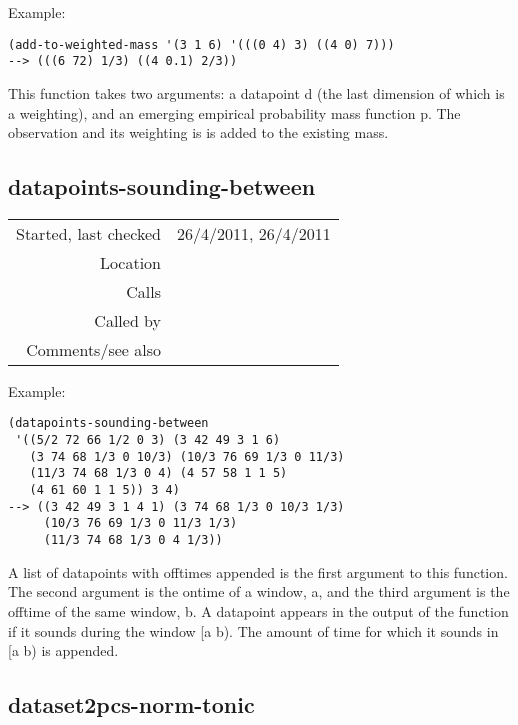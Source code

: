 \vspace{0.5cm}
\noindent Example:
\begin{verbatim}
(add-to-weighted-mass '(3 1 6) '(((0 4) 3) ((4 0) 7)))
--> (((6 72) 1/3) ((4 0.1) 2/3))
\end{verbatim}

\noindent This function takes two arguments: a
datapoint d (the last dimension of which is a
weighting), and an emerging empirical probability mass
function p. The observation and its weighting is
is added to the existing mass.


\subsection*{datapoints-sounding-between}\label{fun:datapoints-sounding-between}

\vspace{0.3cm}
\begin{tabular}{r|p{8cm}}
Started, last checked & 26/4/2011, 26/4/2011 \\
Location & \nameref{sec:keyscape} \\
Calls & \nameref{fun:my-last} \\
Called by & \nameref{fun:keyscape-list} \\
Comments/see also & \nameref{fun:points-sounding-at}
\end{tabular}

\vspace{0.5cm}
\noindent Example:
\begin{verbatim}
(datapoints-sounding-between
 '((5/2 72 66 1/2 0 3) (3 42 49 3 1 6)
   (3 74 68 1/3 0 10/3) (10/3 76 69 1/3 0 11/3)
   (11/3 74 68 1/3 0 4) (4 57 58 1 1 5)
   (4 61 60 1 1 5)) 3 4)
--> ((3 42 49 3 1 4 1) (3 74 68 1/3 0 10/3 1/3)
     (10/3 76 69 1/3 0 11/3 1/3)
     (11/3 74 68 1/3 0 4 1/3))
\end{verbatim}

\noindent A list of datapoints with offtimes
appended is the first argument to this function. The
second argument is the ontime of a window, a, and the
third argument is the offtime of the same window, b. A
datapoint appears in the output of the function if it
sounds during the window [a b). The amount of time for
which it sounds in [a b) is appended.


\subsection*{dataset2pcs-norm-tonic}\label{fun:dataset2pcs-norm-tonic}

